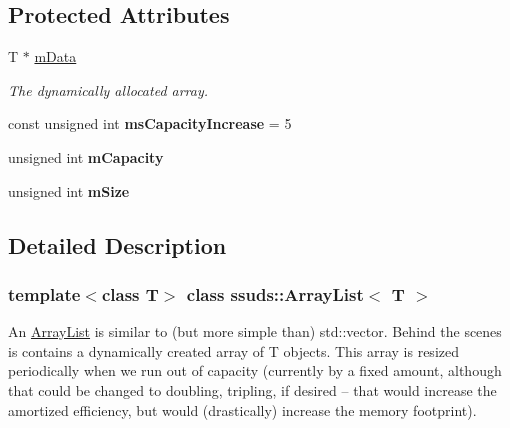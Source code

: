 \subsection*{Protected Attributes}
\begin{DoxyCompactItemize}
\item 
\mbox{\label{classssuds_1_1_array_list_ae43c344eccee75213eb02e96ea3e300e}} 
T $\ast$ \mbox{\hyperlink{classssuds_1_1_array_list_ae43c344eccee75213eb02e96ea3e300e}{m\+Data}}
\begin{DoxyCompactList}\small\item\em The dynamically allocated array. \end{DoxyCompactList}\item 
\mbox{\label{classssuds_1_1_array_list_a7a7645269c1c140c44f79633d5b19af5}} 
const unsigned int {\bfseries ms\+Capacity\+Increase} = 5
\item 
\mbox{\label{classssuds_1_1_array_list_ac4487ae34800f88539054c3721568c10}} 
unsigned int {\bfseries m\+Capacity}
\item 
\mbox{\label{classssuds_1_1_array_list_a8f68ee08bdbaa2f26d017816e4e46e42}} 
unsigned int {\bfseries m\+Size}
\end{DoxyCompactItemize}


\subsection{Detailed Description}
\subsubsection*{template$<$class T$>$\newline
class ssuds\+::\+Array\+List$<$ T $>$}

An \mbox{\hyperlink{classssuds_1_1_array_list}{Array\+List}} is similar to (but more simple than) std\+::vector. Behind the scenes is contains a dynamically created array of T objects. This array is resized periodically when we run out of capacity (currently by a fixed amount, although that could be changed to doubling, tripling, if desired -- that would increase the amortized efficiency, but would (drastically) increase the memory footprint). 

